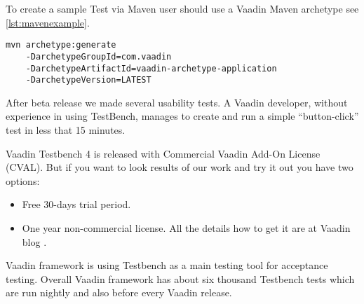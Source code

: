 To create a sample Test via Maven user should use a Vaadin Maven
archetype see \ref{lst:mavenexample}.
\lstset{style=console}
\begin{lstlisting}[caption=Create Vaadin sample application command.,label={lst:mavenexample}]
mvn archetype:generate 
	-DarchetypeGroupId=com.vaadin
	-DarchetypeArtifactId=vaadin-archetype-application
	-DarchetypeVersion=LATEST
\end{lstlisting}

After beta release we made several usability tests.
A Vaadin developer, without experience in using TestBench, manages to create and 
run a simple ``button-click'' test in less that 15 minutes. 

Vaadin Testbench 4 is released with Commercial Vaadin Add-On License 
(CVAL). But if you want to look results of our work and try it out you have two
options:
\begin{itemize}
  \item Free 30-days trial period.
  \item One year non-commercial license. All the details how to get it are at
  Vaadin blog \cite{vaadinBlog}.
\end{itemize}

Vaadin framework is using Testbench as a main testing tool for acceptance
testing. Overall Vaadin framework has about six thousand Testbench tests which
are run nightly and also before every Vaadin release.
